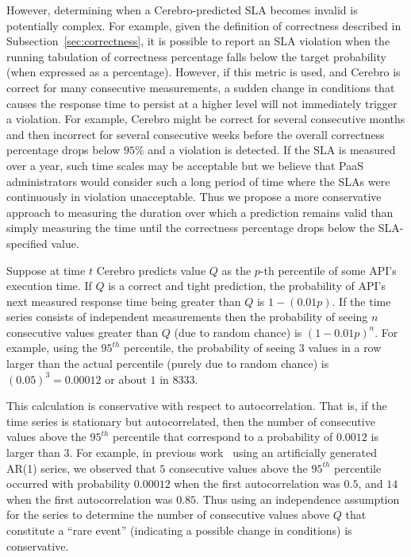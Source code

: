 However, determining when a Cerebro-predicted SLA becomes invalid is
potentially complex. For example, given the definition of correctness
described in Subsection~\ref{sec:correctness}, it is possible to report an SLA violation
when the running tabulation of correctness percentage falls below the target
probability (when expressed as a percentage).  However, if this metric is
used, and Cerebro is correct for many consecutive measurements, a sudden
change in conditions that causes the response time to persist at a higher
level will not immediately trigger a violation.  For example, Cerebro might be
correct for several consecutive months and then incorrect for several
consecutive weeks before the overall correctness percentage drops below $95\%$
and a violation is detected.  If the SLA is measured over a year, such time
scales may be acceptable but we believe that PaaS administrators would
consider such a long period of time where the SLAs were continuously in
violation unacceptable.
Thus we propose a more conservative approach to measuring the duration over
which a prediction remains valid than simply measuring the time until the
correctness percentage drops below the SLA-specified value.

Suppose at time $t$ Cerebro predicts value $Q$ as the $p$-th percentile of
some API's execution time.  If $Q$ is a correct and tight prediction,
the probability of API's next measured response time being greater than 
$Q$ is $1-(0.01p)$.  If the time series consists of independent
measurements then the probability of seeing $n$ consecutive values greater
than $Q$ (due to random chance) is $(1-0.01p)^n$. 
For example, using the $95^{th}$ percentile, the probability of seeing $3$
values in a row larger than the actual percentile (purely due to random chance)
is $(0.05)^3 = 0.00012$ or about $1$ in $8333$.

This calculation is conservative with respect to autocorrelation. That is, if
the time series is stationary but autocorrelated, then the number of consecutive 
values above the $95^{th}$ percentile that correspond to a probability of
$0.0012$ is larger than $3$.  For example, in previous
work~\cite{Nurmi:2007:QQB:1791551.1791556} 
using an artificially generated AR(1) series, 
we observed that $5$ consecutive values above the $95^{th}$ percentile
occurred with probability $0.00012$ when the first autocorrelation was $0.5$,
and $14$ when the first autocorrelation was $0.85$.  Thus using an independence
assumption for the series to determine the number of consecutive values above
$Q$ that constitute a ``rare event'' (indicating a possible change in
conditions) is conservative.

